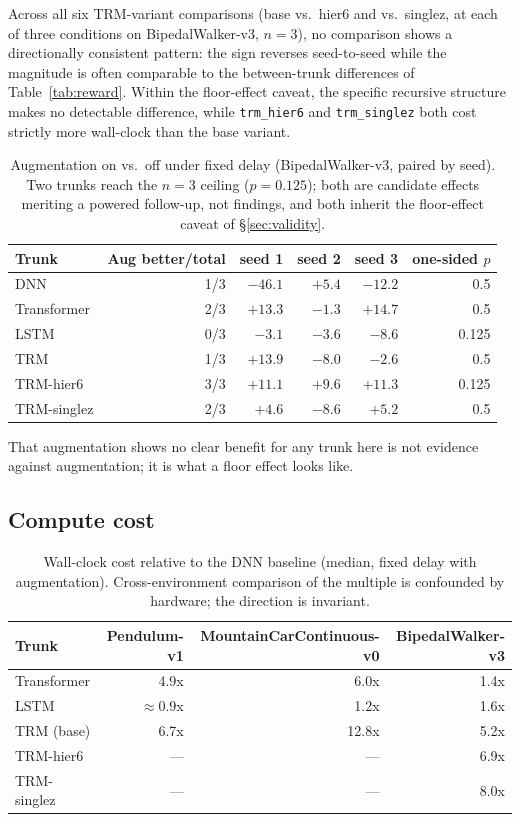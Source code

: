 \documentclass[11pt]{article}
\begin{document}
Across all six TRM-variant comparisons (base vs.\ hier6 and vs.\ singlez, at each of three conditions on BipedalWalker-v3, $n=3$), no comparison shows a directionally consistent pattern: the sign reverses seed-to-seed while the magnitude is often comparable to the between-trunk differences of Table~\ref{tab:reward}. Within the floor-effect caveat, the specific recursive structure makes no detectable difference, while \texttt{trm\_hier6} and \texttt{trm\_singlez} both cost strictly more wall-clock than the base variant.

\begin{table}[h]
\centering
\small
\begin{tabular}{lrrrrr}
\toprule
Trunk & Aug better/total & seed 1 & seed 2 & seed 3 & one-sided $p$ \\
\midrule
DNN & 1/3 & $-46.1$ & $+5.4$ & $-12.2$ & 0.5 \\
Transformer & 2/3 & $+13.3$ & $-1.3$ & $+14.7$ & 0.5 \\
LSTM & 0/3 & $-3.1$ & $-3.6$ & $-8.6$ & 0.125 \\
TRM & 1/3 & $+13.9$ & $-8.0$ & $-2.6$ & 0.5 \\
TRM-hier6 & 3/3 & $+11.1$ & $+9.6$ & $+11.3$ & 0.125 \\
TRM-singlez & 2/3 & $+4.6$ & $-8.6$ & $+5.2$ & 0.5 \\
\bottomrule
\end{tabular}
\caption{Augmentation on vs.\ off under fixed delay (BipedalWalker-v3, paired by seed). Two trunks reach the $n=3$ ceiling ($p=0.125$); both are candidate effects meriting a powered follow-up, not findings, and both inherit the floor-effect caveat of \S\ref{sec:validity}.}
\end{table}

That augmentation shows no clear benefit for any trunk here is not evidence against augmentation; it is what a floor effect looks like.

\subsection{Compute cost}

\begin{table}[h]
\centering
\small
\begin{tabular}{lrrr}
\toprule
Trunk & Pendulum-v1 & MountainCarContinuous-v0 & BipedalWalker-v3 \\
\midrule
Transformer & 4.9x & 6.0x & 1.4x \\
LSTM & ${\approx}0.9$x & 1.2x & 1.6x \\
TRM (base) & 6.7x & 12.8x & 5.2x \\
TRM-hier6 & --- & --- & 6.9x \\
TRM-singlez & --- & --- & 8.0x \\
\bottomrule
\end{tabular}
\caption{Wall-clock cost relative to the DNN baseline (median, fixed delay with augmentation). Cross-environment comparison of the multiple is confounded by hardware; the direction is invariant.}
\end{table}
\end{document}

